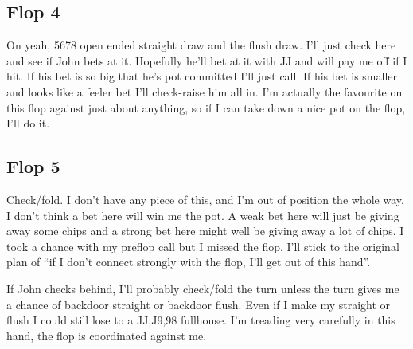 \subsection*{Flop 4}

\begin{cards}
\crdsevh\crdtwoc\crdfivec%
\end{cards}

On yeah, 5678 open ended straight draw and the flush draw. I'll just
check here and see if John bets at it. Hopefully he'll bet at it with
JJ and will pay me off if I hit. If his bet is so big that he's pot
committed I'll just call. If his bet is smaller and looks like
a feeler bet I'll check-raise him all in. I'm actually the
favourite on this flop against just about anything, so if I
can take down a nice pot on the flop, I'll do it.

\subsection*{Flop 5}

\begin{cards}
\crdJh\crdnineh\crdninec%
\end{cards}

Check/fold. I don't have any piece of this, and I'm out of
position the whole way. I don't think a bet here will win me
the pot. A weak bet here will just be giving away some chips
and a strong bet here might well be giving away a lot of chips.
I took a chance with my preflop call but I missed the flop.
I'll stick to the original plan of ``if I don't connect strongly with
the flop, I'll get out of this hand''.

If John checks behind, I'll probably check/fold the
turn unless the turn gives me a chance of backdoor straight
or backdoor flush. Even if I make my straight or flush I could
still lose to a JJ,J9,98 fullhouse. I'm treading very carefully in
this hand, the flop is coordinated against me.


